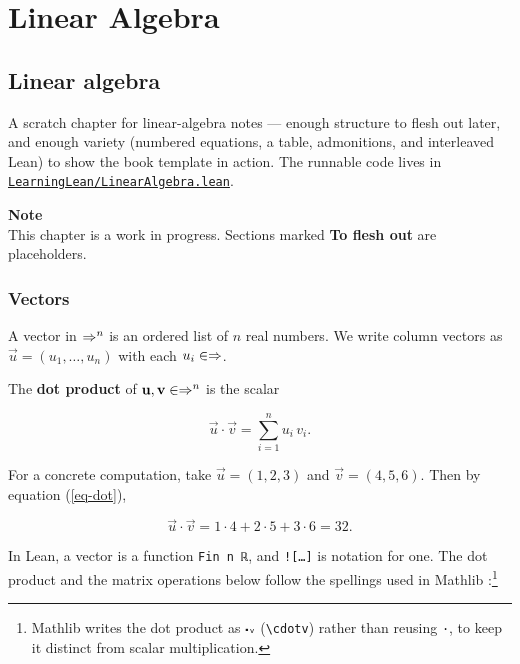 \section{Linear Algebra}

\subsection{Linear algebra}

A scratch chapter for linear-algebra notes --- enough structure to flesh out later, and
enough variety (numbered equations, a table, admonitions, and interleaved Lean) to show
the book template in action. The runnable code lives in
\href{/LinearAlgebra-21b7e76089afe77d1ab624eef2fc49b2.lean}{\texttt{LearningLean/LinearAlgebra.lean}}.

\begin{framed}
\textbf{Note}\\
This chapter is a work in progress. Sections marked \textbf{To flesh out} are placeholders.
\end{framed}

\subsubsection{Vectors}

A vector in $\Rightarrow^n$ is an ordered list of $n$ real numbers. We write column vectors as
$\vec{u} = (u_1, \dots, u_n)$ with each $u_i \in \Rightarrow$.

The \textbf{dot product} of $\mathbf{u}, \mathbf{v} \in \Rightarrow^n$ is the scalar

\begin{equation}
\label{eq-dot}
\vec{u} \cdot \vec{v} = \sum_{i=1}^{n} u_i\, v_i .
\end{equation}

For a concrete computation, take $\vec{u} = (1, 2, 3)$ and $\vec{v} = (4, 5, 6)$. Then by
equation (\ref{eq-dot}),

\begin{equation}
\vec{u} \cdot \vec{v} = 1\cdot 4 + 2\cdot 5 + 3\cdot 6 = 32 .
\end{equation}

In Lean, a vector is a function \texttt{Fin n \rightarrow ℝ}, and \texttt{![\dots]} is notation for one. The dot product and
the matrix operations below follow the spellings used in Mathlib \citep{mathlib2020}:\footnote{Mathlib writes the dot product as \texttt{⬝ᵥ} (\texttt{{\textbackslash}cdotv}) rather than reusing \texttt{·}, to keep
it distinct from scalar multiplication.}

